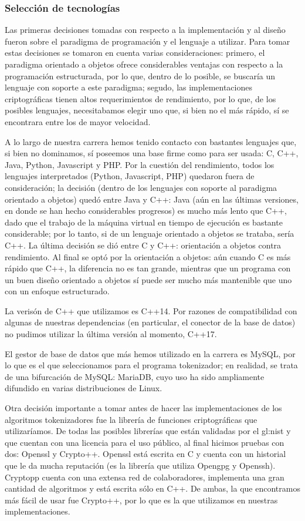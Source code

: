 \subsubsection{Selección de tecnologías}
\label{sec:tecnologias}

Las primeras decisiones tomadas con respecto a la implementación y al diseño
fueron sobre el paradigma de programación y el lenguaje a utilizar. Para
tomar estas decisiones se tomaron en cuenta varias consideraciones: primero,
el paradigma orientado a objetos ofrece considerables ventajas con respecto
a la programación estructurada, por lo que, dentro de lo posible, se buscaría
un lenguaje con soporte a este paradigma; segudo, las implementaciones
criptográficas tienen altos requerimientos de rendimiento, por lo que, de los
posibles lenguajes, necesitabamos elegir uno que, si bien no el más rápido,
sí se encontrara entre los de mayor velocidad.

A lo largo de nuestra carrera hemos tenido contacto con bastantes lenguajes que,
si bien no dominamos, sí poseemos una base firme como para ser usada: C, C++,
Java, Python, Javascript y PHP. Por la cuestión del rendimiento, todos los
lenguajes interpretados (Python, Javascript, PHP) quedaron fuera de
consideración; la decisión (dentro de los lenguajes con soporte al paradigma
orientado a objetos) quedó entre Java y C++: Java (aún en las últimas versiones,
en donde se han hecho considerables progresos) es mucho más lento que C++,
dado que el trabajo de la máquina virtual en tiempo de ejecución es bastante
considerable; por lo tanto, si de un lenguaje orientado a objetos se trataba,
sería C++. La última decisión se dió entre C y C++: orientación a objetos contra
rendimiento. Al final se optó por la orientación a objetos: aún cuando C es
más rápido que C++, la diferencia no es tan grande, mientras que un programa
con un buen diseño orientado a objetos sí puede ser mucho más mantenible que
uno con un enfoque estructurado.

La verisón de C++ que utilizamos es C++14. Por razones de compatibilidad con
algunas de nuestras dependencias (en particular, el conector de la base de
datos) no pudimos utilizar la última versión al momento, C++17.

El gestor de base de datos que más hemos utilizado en la carrera es MySQL,
por lo que es el que seleccionamos para el programa tokenizador; en realidad,
se trata de una bifurcación de MySQL: MariaDB, cuyo uso ha sido ampliamente
difundido en varias distribuciones de Linux.

Otra decisión importante a tomar antes de hacer las implementaciones de los
algoritmos tokenizadores fue la librería de funciones criptográficas que
utilizaríamos. De todas las posibles librerías que están validadas
por el \gls{gl:nist} y que cuentan con una licencia para el uso público, al
final hicimos pruebas con dos: Openssl y Crypto++. Openssl está escrita
en C y cuenta con un historial que le da mucha reputación (es la librería
que utiliza Opengpg y Openssh). Cryptopp cuenta con una extensa red de
colaboradores, implementa una gran cantidad de algoritmos y está escrita sólo
en C++. De ambas, la que encontramos más fácil de usar fue Crypto++, por lo que
es la que utilizamos en nuestras implementaciones.
